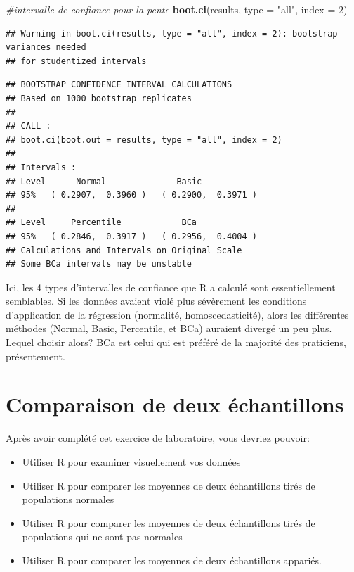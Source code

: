 \documentclass[12pt,]{book}
\newenvironment{Shaded}{\begin{snugshade}}{\end{snugshade}}
\newcommand{\CommentTok}[1]{\textcolor[rgb]{0.37,0.37,0.37}{\textit{#1}}}
\newcommand{\DataTypeTok}[1]{\textcolor[rgb]{0.27,0.27,0.27}{#1}}
\newcommand{\DecValTok}[1]{\textcolor[rgb]{0.06,0.06,0.06}{#1}}
\newcommand{\KeywordTok}[1]{\textcolor[rgb]{0.27,0.27,0.27}{\textbf{#1}}}
\newcommand{\NormalTok}[1]{#1}
\newcommand{\StringTok}[1]{\textcolor[rgb]{0.5,0.5,0.5}{#1}}
\providecommand{\tightlist}{%
  \setlength{\itemsep}{0pt}\setlength{\parskip}{0pt}}
\begin{document}
\begin{Shaded}
\begin{Highlighting}[]
\CommentTok{#intervalle de confiance pour la pente}
\KeywordTok{boot.ci}\NormalTok{(results, }\DataTypeTok{type =} \StringTok{"all"}\NormalTok{, }\DataTypeTok{index =} \DecValTok{2}\NormalTok{)}
\end{Highlighting}
\end{Shaded}

\begin{verbatim}
## Warning in boot.ci(results, type = "all", index = 2): bootstrap variances needed
## for studentized intervals
\end{verbatim}

\begin{verbatim}
## BOOTSTRAP CONFIDENCE INTERVAL CALCULATIONS
## Based on 1000 bootstrap replicates
## 
## CALL : 
## boot.ci(boot.out = results, type = "all", index = 2)
## 
## Intervals : 
## Level      Normal              Basic         
## 95%   ( 0.2907,  0.3960 )   ( 0.2900,  0.3971 )  
## 
## Level     Percentile            BCa          
## 95%   ( 0.2846,  0.3917 )   ( 0.2956,  0.4004 )  
## Calculations and Intervals on Original Scale
## Some BCa intervals may be unstable
\end{verbatim}

Ici, les 4 types d'intervalles de confiance que R a calculé sont essentiellement semblables. Si les données avaient violé plus sévèrement les conditions d'application de la régression (normalité, homoscedasticité), alors les différentes méthodes (Normal, Basic, Percentile, et BCa) auraient divergé un peu plus. Lequel choisir alors? BCa est celui qui est préféré de la majorité des praticiens, présentement.

\hypertarget{comparaison-de-deux-uxe9chantillons}{%
\chapter{Comparaison de deux échantillons}\label{comparaison-de-deux-uxe9chantillons}}

Après avoir complété cet exercice de laboratoire, vous devriez pouvoir:

\begin{itemize}
\tightlist
\item
  Utiliser R pour examiner visuellement vos données
\item
  Utiliser R pour comparer les moyennes de deux échantillons tirés de populations normales
\item
  Utiliser R pour comparer les moyennes de deux échantillons tirés de populations qui ne sont pas normales
\item
  Utiliser R pour comparer les moyennes de deux échantillons appariés.
\end{itemize}
\end{document}
